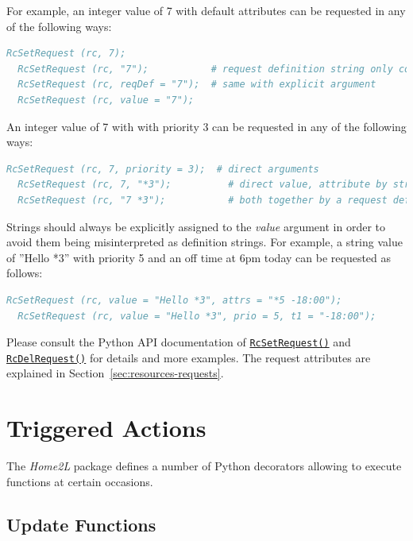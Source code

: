 \documentclass[12pt,english,parskip=half,headheight=19pt]{scrreprt}
\newcommand{\refapic}[1]{\href{home2l-api_c/index.html}{\mbox{\texttt{#1}}}}            %
\newcommand{\refapipython}[1]{\href{home2l-api_python/index.html}{\mbox{\texttt{#1}}}}  %
\begin{document}
For example, an integer value of 7 with default attributes can be requested in any of the following ways:
\begin{lstlisting}[language=comments]
  RcSetRequest (rc, 7);
  RcSetRequest (rc, "7");           # request definition string only containing the value
  RcSetRequest (rc, reqDef = "7");  # same with explicit argument
  RcSetRequest (rc, value = "7");
\end{lstlisting}

An integer value of 7 with with priority 3 can be requested in any of the following ways:
\begin{lstlisting}[language=comments]
  RcSetRequest (rc, 7, priority = 3);  # direct arguments
  RcSetRequest (rc, 7, "*3");          # direct value, attribute by string
  RcSetRequest (rc, "7 *3");           # both together by a request definition string
\end{lstlisting}

Strings should always be explicitly assigned to the \textit{value} argument in order to avoid them being misinterpreted as definition strings. For example, a string value of ''Hello *3'' with priority 5 and an off time at 6pm today can be requested as follows:
\begin{lstlisting}[language=comments]
  RcSetRequest (rc, value = "Hello *3", attrs = "*5 -18:00");
  RcSetRequest (rc, value = "Hello *3", prio = 5, t1 = "-18:00");
\end{lstlisting}

Please consult the Python API documentation of \refapipython{RcSetRequest()} and \refapic{RcDelRequest()} for details and more examples. The request attributes are explained in Section~\ref{sec:resources-requests}.





\section{Triggered Actions}
\label{sec:rules-actions}

The \textit{Home2L} package defines a number of Python decorators allowing to execute functions at certain occasions.



\subsection{Update Functions}
\label{sec:rules-actions-onupdate}
\end{document}
